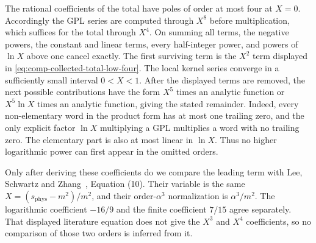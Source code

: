 The rational coefficients of the total have poles of order at most
four at $X=0$. Accordingly the GPL series are computed through $X^8$
before multiplication, which suffices for the total through $X^4$.
On summing all terms, the negative powers, the constant and linear
terms, every half-integer power, and powers of $\ln X$ above one
cancel exactly. The first surviving term is the $X^2$ term displayed
in \eqref{eq:comp-collected-total-low-four}. The local kernel series
converge in a sufficiently small interval $0<X<1$.
After the displayed terms are removed, the next possible contributions
have the form $X^5$ times an analytic function or $X^5\ln X$ times an
analytic function, giving the stated remainder. Indeed, every
non-elementary word in the product form has at most one trailing zero,
and the only explicit factor $\ln X$ multiplying a GPL multiplies a
word with no trailing zero. The elementary part is also at most linear
in $\ln X$. Thus no higher logarithmic power can first appear in the
omitted orders.

Only after deriving these coefficients do we compare the leading
term with Lee, Schwartz and Zhang~\cite{qed-processes-lsz},
Equation (10). Their variable is the same $X=(s_{\mathrm{phys}}-m^2)/m^2$,
and their order-$\alpha^3$ normalization is $\alpha^3/m^2$.
The logarithmic coefficient $-16/9$ and the finite coefficient $7/15$
agree separately. That displayed literature equation does not give
the $X^3$ and $X^4$ coefficients, so no comparison of those two orders
is inferred from it.
